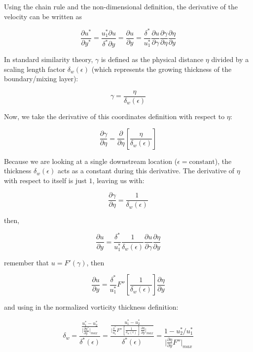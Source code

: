 Using the chain rule and the non-dimensional definition, the derivative of the velocity can be written as 

\begin{equation*}
   \frac{\partial u^*}{\partial y^*}
   =
   \frac{u^*_1 \partial  u}{\delta^* \partial y}
   =
   \frac{\partial u}{\partial y}
   =
   \frac{\delta^*}{u^*_1}
   \frac{\partial u}{\partial \gamma}
   \frac{\partial \gamma}{\partial \eta}
   \frac{\partial \eta}{\partial y}
\end{equation*}

In standard similarity theory, $\gamma$  is defined as the physical distance $\eta$
divided by a scaling length factor $\delta_w(\epsilon)$ (which represents the growing
thickness of the boundary/mixing layer):

$$\gamma = \frac{\eta}{\delta_w(\epsilon)}$$

 Now, we
 take the derivative of this coordinates definition with respect to $\eta$:
 
$$
\frac{\partial \gamma}{\partial \eta}
 = 
\frac{\partial}{\partial \eta}
\left[
\frac{\eta}{\delta_w(\epsilon)}
\right]
$$

 Because we are looking at a single downstream
 location ($\epsilon = \text{constant}$), the thickness $\delta_w(\epsilon)$ acts as a constant
 during this derivative. The derivative of $\eta$ with respect to itself is just
 $1$, leaving us with:
 
 $$
 \frac{\partial \gamma}{\partial \eta}
 =
\frac{1}{\delta_w(\epsilon)}
 $$

then,

\begin{equation*}
   \frac{\partial u}{\partial y}
   =
   \frac{\delta^*}{u^*_1}
   \frac{1}{\delta_w(\epsilon)}
   \frac{\partial u}{\partial \gamma}
   \frac{\partial \eta}{\partial y}
\end{equation*}

remember that $u=F'(\gamma)$, then

\begin{equation*}
   \frac{\partial u}{\partial y}
   =
   \frac{\delta^*}{u^*_1}
   F''
   \left[
   \frac{1}{\delta_w(\epsilon)}
   \right]
   \frac{\partial \eta}{\partial y}
\end{equation*}


and using in the normalized vorticity thickness definition:

\begin{equation*}
\delta_w
=
\dfrac{
 \frac{u_1^*-u_2^*}{\big|\frac{\partial u^* }{\partial y^*}\big|_{max}}
}{\delta^*(\epsilon)}
=
\dfrac{
 \frac{u_1^*-u_2^*}{\big|
   \frac{\delta^*}{u^*_1}
   F''
   \left[
   \frac{1}{\delta_w(\epsilon)}
   \right]
   \frac{\partial \eta}{\partial y}
\big|_{max}}
}{\delta^*(\epsilon)}
=
 \frac{1-u_2^*/u_1^*}
 {
   \big|
   \frac{\partial \eta}{\partial y}
   F''
   \big|_{max}
  }
\end{equation*}

